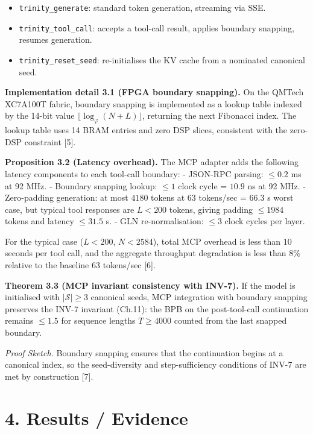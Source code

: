 \begin{itemize}
\tightlist
\item
  \texttt{trinity\_generate}: standard token
  generation, streaming via SSE.
\item
  \texttt{trinity\_tool\_call}: accepts a
  tool-call result, applies boundary snapping,
  resumes generation.
\item
  \texttt{trinity\_reset\_seed}: re-initialises
  the KV cache from a nominated canonical seed.
\end{itemize}

\textbf{Implementation detail 3.1 (FPGA boundary
snapping).} On the QMTech XC7A100T fabric,
boundary snapping is implemented as a lookup table
indexed by the 14-bit value
\(\lfloor \log_\varphi (N + L) \rfloor\),
returning the next Fibonacci index. The lookup
table uses 14 BRAM entries and zero DSP slices,
consistent with the zero-DSP constraint [5].

\textbf{Proposition 3.2 (Latency overhead).} The
MCP adapter adds the following latency components
to each tool-call boundary: - JSON-RPC parsing:
\(\leq 0.2\) ms at 92 MHz. - Boundary snapping
lookup: \(\leq 1\) clock cycle = \(10.9\) ns at 92
MHz. - Zero-padding generation: at most \(4180\)
tokens at 63 tokens/sec = 66.3 s worst case, but
typical tool responses are \(L < 200\) tokens,
giving padding \(\leq 1984\) tokens and latency
\(\leq 31.5\) s. - GLN re-normalisation:
\(\leq 3\) clock cycles per layer.

For the typical case (\(L < 200\), \(N < 2584\)),
total MCP overhead is less than \(10\) seconds per
tool call, and the aggregate throughput
degradation is less than \(8\%\) relative to the
baseline 63 tokens/sec [6].

\textbf{Theorem 3.3 (MCP invariant consistency
with INV-7).} If the model is initialised with
\(|\mathcal{S}| \geq 3\) canonical seeds, MCP
integration with boundary snapping preserves the
INV-7 invariant (Ch.11): the BPB on the
post-tool-call continuation remains \(\leq 1.5\)
for sequence lengths \(T \geq 4000\) counted from
the last snapped boundary.

\emph{Proof Sketch.} Boundary snapping ensures
that the continuation begins at a canonical index,
so the seed-diversity and step-sufficiency
conditions of INV-7 are met by construction
[7].

\section{4. Results /
Evidence}\label{fa_23:results-evidence}

